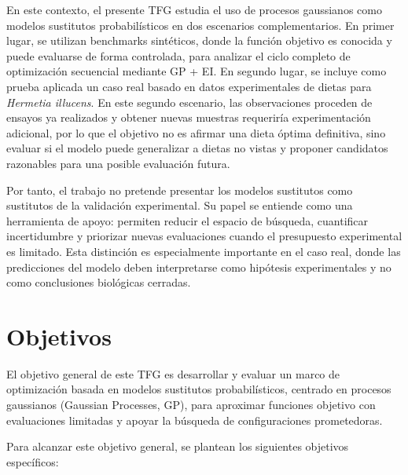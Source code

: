 En este contexto, el presente TFG estudia el uso de procesos gaussianos como modelos sustitutos probabilísticos en dos escenarios complementarios. En primer lugar, se utilizan benchmarks sintéticos, donde la función objetivo es conocida y puede evaluarse de forma controlada, para analizar el ciclo completo de optimización secuencial mediante GP + EI. En segundo lugar, se incluye como prueba aplicada un caso real basado en datos experimentales de dietas para \textit{Hermetia illucens}. En este segundo escenario, las observaciones proceden de ensayos ya realizados y obtener nuevas muestras requeriría experimentación adicional, por lo que el objetivo no es afirmar una dieta óptima definitiva, sino evaluar si el modelo puede generalizar a dietas no vistas y proponer candidatos razonables para una posible evaluación futura.


Por tanto, el trabajo no pretende presentar los modelos sustitutos como sustitutos de la validación experimental. Su papel se entiende como una herramienta de apoyo: permiten reducir el espacio de búsqueda, cuantificar incertidumbre y priorizar nuevas evaluaciones cuando el presupuesto experimental es limitado. Esta distinción es especialmente importante en el caso real, donde las predicciones del modelo deben interpretarse como hipótesis experimentales y no como conclusiones biológicas cerradas.

\section{Objetivos}
\label{sec:objetivos}

El objetivo general de este TFG es desarrollar y evaluar un marco de optimización basada en modelos sustitutos probabilísticos, centrado en procesos gaussianos (Gaussian Processes, GP), para aproximar funciones objetivo con evaluaciones limitadas y apoyar la búsqueda de configuraciones prometedoras.

Para alcanzar este objetivo general, se plantean los siguientes objetivos específicos:

